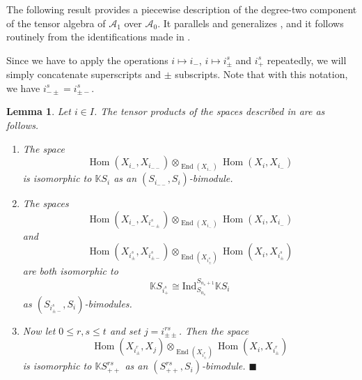 \documentclass[11pt]{article}
\renewcommand{\labelenumi}{(\arabic{enumi})}
\theoremstyle{plain}
\newtheorem{lemma}{Lemma}[section]
\theoremstyle{nonumberplain}
\theoremstyle{plain}
\theoremstyle{nonumberplain}
\newcommand\bK{\mathbb K}
\newcommand\cA{\mathcal A}
\DeclareMathOperator{\End}{\mathrm{End}}
\DeclareMathOperator{\Hom}{\mathrm{Hom}}
\newcommand{\qedhere}{\mbox{}\hfill\ensuremath{\blacksquare}}
\begin{document}
The following result provides a piecewise description of the
degree-two component of the tensor algebra of $\cA_1$ over $\cA_0$. It
parallels and generalizes \cite[Lemma 3.25]{us}, and it follows
routinely from the identifications made in
.


Since we have to apply the operations $i\mapsto i_-$,
$i\mapsto i^s_{\pm}$ and $i^s_+$ repeatedly, we will simply
concatenate superscripts and $\pm$ subscripts. Note that with this
notation, we have $i^s_{-\pm}=i^s_{\pm -}$.




\begin{lemma}\label{le.deg-2}
  Let $i\in I$. The tensor products of the
  spaces described in  are as follows.
  \begin{enumerate}
        \renewcommand{\labelenumi}{(\alph{enumi})}
      \item The space
        \begin{equation}
          \label{eq:1}
          \Hom(X_{i_-},X_{i_{--}})\otimes_{\End(X_{i_-})}\Hom(X_i,X_{i_-})
        \end{equation}
        is isomorphic to $\bK S_i$ as an $(S_{i_{--}},S_i)$-bimodule.
      \item The spaces
        \begin{equation}
          \label{eq:2}
          \Hom(X_{i_-},X_{i^s_{-\pm}})\otimes_{\End(X_{i_-})}\Hom(X_i,X_{i_-})
        \end{equation}
        and
        \begin{equation}
          \label{eq:3}
          \Hom(X_{i^s_{\pm}},X_{i^s_{\pm-}})\otimes_{\End(X_{i^s_{\pm}})}\Hom(X_i,X_{i^s_{\pm}})
        \end{equation}
        are both isomorphic to
        \begin{equation*}
          \bK S_{i^s_+} \cong \mathrm{Ind}_{S_{n_s}}^{S_{n_s+1}}\bK S_i
        \end{equation*}
        as $(S_{i^s_{\pm-}},S_i)$-bimodules.
      \item Now let $0\le r, s\le t$ and set $j=i^{rs}_{\pm\pm}$. Then the space
        \begin{equation}
          \label{eq:4}
          \Hom(X_{i^r_{\pm}},X_j)\otimes_{\End(X_{i^r_{\pm}})}\Hom(X_i,X_{i^r_{\pm}})
        \end{equation}
        is isomorphic to $\bK S^{rs}_{++}$ as an $(S^{rs}_{++},S_i)$-bimodule.
        \qedhere
  \end{enumerate}
\end{lemma}
\end{document}
